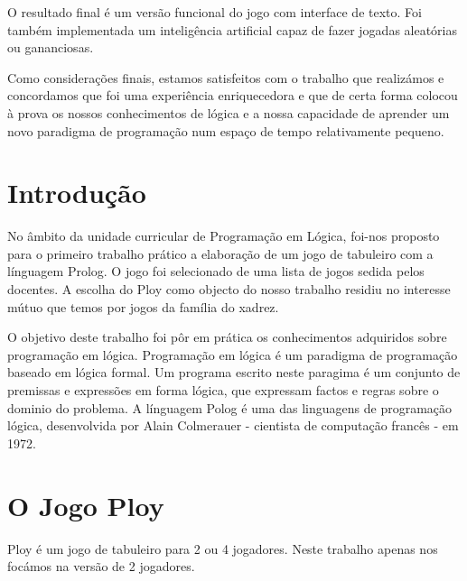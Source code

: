 \documentclass[a4paper]{article}
\begin{document}
O resultado final é um versão funcional do jogo com interface de texto. Foi também implementada um inteligência artificial capaz de fazer jogadas aleatórias ou gananciosas.

Como considerações finais, estamos satisfeitos com o trabalho que realizámos e concordamos que foi uma experiência enriquecedora e que de certa forma colocou à prova os nossos conhecimentos de lógica e a nossa capacidade de aprender um novo paradigma de programação num espaço de tempo relativamente pequeno.


\newpage

\tableofcontents



\newpage

\section{Introdução}
No âmbito da unidade curricular de Programação em Lógica, foi-nos proposto para o primeiro trabalho prático a elaboração de um jogo de tabuleiro com a línguagem Prolog. O jogo foi selecionado de uma lista de jogos sedida pelos docentes. A escolha do Ploy como objecto do nosso trabalho residiu no interesse mútuo que temos por jogos da família do xadrez.

O objetivo deste trabalho foi pôr em prática os conhecimentos adquiridos sobre programação em lógica. Programação em lógica é um paradigma de programação baseado em lógica formal. Um programa escrito neste paragima é um conjunto de premissas e expressões em forma lógica, que expressam factos e regras sobre o dominio do problema. A línguagem Polog é uma das linguagens de programação lógica, desenvolvida por Alain Colmerauer - cientista de computação francês - em 1972.


\section{O Jogo Ploy}
Ploy é um jogo de tabuleiro para 2 ou 4 jogadores. Neste trabalho apenas nos focámos na versão de 2 jogadores.
\end{document}
